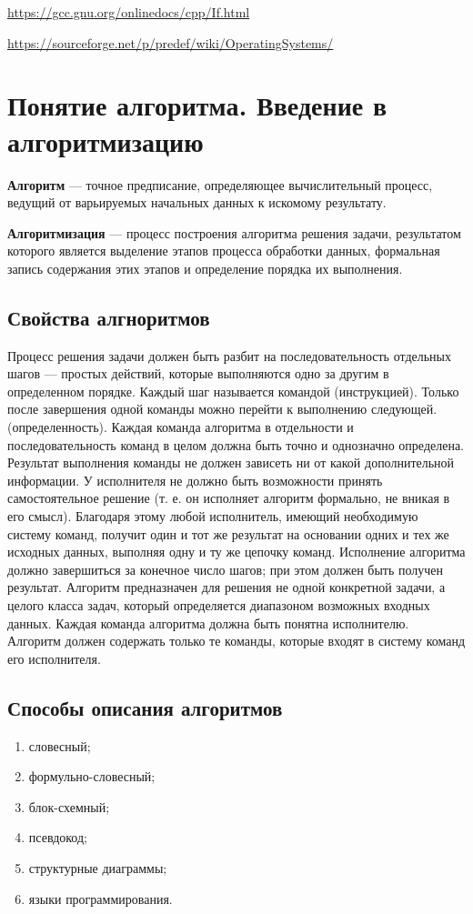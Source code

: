 \url{https://gcc.gnu.org/onlinedocs/cpp/If.html}

\url{https://sourceforge.net/p/predef/wiki/OperatingSystems/}

\section{Понятие алгоритма. Введение в алгоритмизацию}
\textbf{Алгоритм} --- точное предписание, определяющее вычислительный процесс, ведущий от варьируемых
начальных данных к искомому результату.

\textbf{Алгоритмизация} --- процесс построения алгоритма решения задачи, результатом которого является
выделение этапов процесса обработки данных, формальная запись содержания этих этапов и определение
порядка их выполнения.

\subsection*{Свойства алгноритмов}
\begin{enumerate}
   Процесс решения задачи должен быть разбит на последовательность отдельных шагов — простых действий,
  которые выполняются одно за другим в определенном порядке. Каждый шаг называется командой (инструкцией).
  Только после завершения одной команды можно перейти к выполнению следующей.
   (определенность). Каждая команда алгоритма в отдельности и последовательность команд в
  целом должна быть точно и однозначно определена. Результат выполнения команды не должен зависеть ни от какой дополнительной
  информации. У исполнителя не должно быть возможности принять самостоятельное решение (т. е. он исполняет алгоритм формально,
  не вникая в его смысл).
  Благодаря этому любой исполнитель, имеющий необходимую систему команд, получит один и тот же результат на основании одних и
  тех же исходных данных, выполняя одну и ту же цепочку команд.
   Исполнение алгоритма должно завершиться за конечное число шагов;
  при этом должен быть получен результат.
   Алгоритм предназначен для решения не одной конкретной задачи, а целого класса задач, который определяется
  диапазоном возможных входных данных.
   Каждая команда алгоритма должна быть понятна исполнителю. Алгоритм должен содержать только те команды,
  которые входят в систему команд его исполнителя.
\end{enumerate}

\subsection*{Способы описания алгоритмов}
\begin{enumerate}
  \item словесный;
  \item формульно-словесный;
  \item блок-схемный;
  \item псевдокод;
  \item структурные диаграммы;
  \item языки программирования.
\end{enumerate}
